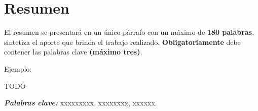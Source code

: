 \chapter*{Resumen}

El resumen se presentará en un único párrafo con un máximo de \textbf{180 palabras}, sintetiza el aporte que brinda el trabajo realizado. \textbf{Obligatoriamente} debe contener las palabras clave \textbf{(máximo tres)}.

\vspace{0.5cm}

Ejemplo:

\vspace{0.5cm}

TODO

\vspace{0.5cm}

\textbf{\textit{Palabras clave:}} xxxxxxxxx, xxxxxxxx, xxxxxx.